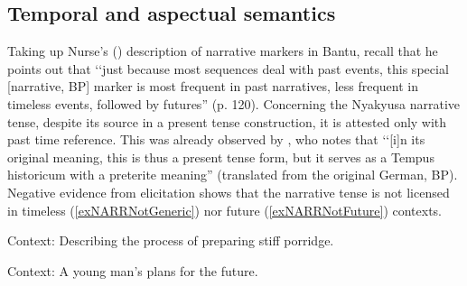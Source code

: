 \subsection{Temporal and aspectual semantics}
\label{NARRpast}
Taking up Nurse's (\citeyear{NurseD2008}) description of narrative markers in Bantu, recall that he points out that \lq\lq just because most sequences deal with past events, this special [narrative, BP] marker is most frequent in past narratives, less frequent in timeless events, followed by futures'' (p. 120). Concerning the Nyakyusa narrative tense, despite its source in a present tense construction, it is attested only with past time reference. This was already observed by \citet[61]{EndemannC1914}, who notes that \lq\lq [i]n its original meaning, this is thus a present tense form, but it serves as a Tempus historicum with a preterite meaning'' (translated from the original German, BP). Negative evidence from elicitation shows that the narrative tense is not licensed in timeless  (\ref{exNARRNotGeneric}) nor future (\ref{exNARRNotFuture}) contexts.

\begin{exe}
\ex \label{exNARRNotGeneric}
Context: Describing the process of preparing stiff porridge.
\begin{xlist}
\end{xlist}
\ex \label{exNARRNotFuture} Context: A young man's plans for the future.
\begin{xlist}
\end{xlist}
\end{exe}

